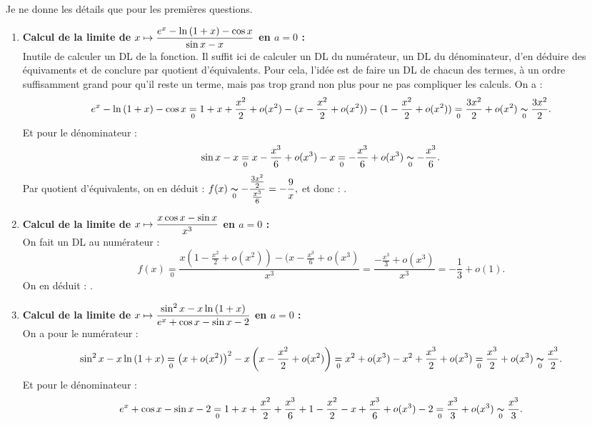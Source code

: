 \documentclass[a4paper, 11pt,reqno]{article}
\begin{document}
\vspace*{0.5cm}
\begin{correction}  \;
	Je ne donne les d\'etails que pour les premi\`eres questions.
	\begin{enumerate}
		\item \textbf{Calcul de la limite de $x\mapsto \displaystyle\frac{e^x-\ln{(1+x)} -\cos{x}  }{\sin{x}-x}$ en $a=0$ :}\\
		      Inutile de calculer un DL de la fonction. Il suffit ici de calculer un DL du numérateur, un DL du d\'enominateur, d'en d\'eduire des \'equivaments et de conclure par quotient d'\'equivalents. Pour cela, l'id\'ee est de faire un DL de chacun des termes, \`a un ordre suffisamment grand pour qu'il reste un terme, mais pas trop grand non plus pour ne pas compliquer les calculs. On a :
		      $$e^x-\ln{(1+x)} -\cos{x}  \underset{0}{=} 1+x+\frac{x^2}{2} +o(x^2)- (x-\frac{x^2}{2}+o(x^2))-(1-\frac{x^2}{2}+o(x^2))   \underset{0}{=} \frac{3x^2}{2} + o(x^2) \underset{0}{\thicksim} \frac{3x^2}{2}.$$
		      Et pour le d\'enominateur :
		      $$\sin{x}-x \underset{0}{=} x-\frac{x^3}{6}+o(x^3)-x \underset{0}{=} -\frac{x^3}{6}+o(x^3)  \underset{0}{\thicksim} -\frac{x^3}{6}.$$
		      Par quotient d'\'equivalents, on en d\'eduit : $f(x) \displaystyle \underset{0}{\thicksim} - \frac{\frac{3x^2}{2}}{\frac{x^3}{6}} = - \frac{9}{x},$ et donc : .
		\item \textbf{Calcul de la limite de $x\mapsto \displaystyle\frac{x\cos{x} -\sin{x} }{x^3}$ en $a=0$ :}\\
		      On fait un DL au num\'erateur :
		      $$f(x) \underset{0}{=} \frac{x(1-\frac{x^2}{2}+o(x^2)) -(x-\frac{x^3}{6}+o(x^3)}{x^3} = \frac{-\frac{x^3}{3}+o(x^3)}{x^3} = -\frac{1}{3} + o(1).$$
		      On en d\'eduit : .
		\item \textbf{Calcul de la limite de $x\mapsto \displaystyle\frac{\sin^2{x}-x\ln{(1+x)}   }{e^x+\cos{x}-\sin{x}-2  }$ en $a=0$ :}\\
		      On a pour le num\'erateur :
		      $$\sin^2{x}-x\ln{(1+x)} \underset{0}{=}  \left(x+o(x^2)\right)^2 - x \left(x-\frac{x^2}{2}+o(x^2)\right) \underset{0}{=} x^2 +o(x^3) - x^2 +\frac{x^3}{2} + o(x^3) \underset{0}{=} \frac{x^3}{2}+o(x^3)  \underset{0}{\thicksim} \frac{x^3}{2}.$$
		      Et pour le d\'enominateur :
		      $$e^x+\cos{x}-\sin{x}-2 \underset{0}{=} 1+x+\frac{x^2}{2} +\frac{x^3}{6} + 1-\frac{x^2}{2}- x +\frac{x^3}{6} +o(x^3) -2 \underset{0}{=} \frac{x^3}{3} +o(x^3) \underset{0}{\thicksim} \frac{x^3}{3}.$$

\end{enumerate}
\end{correction}
\end{document}
